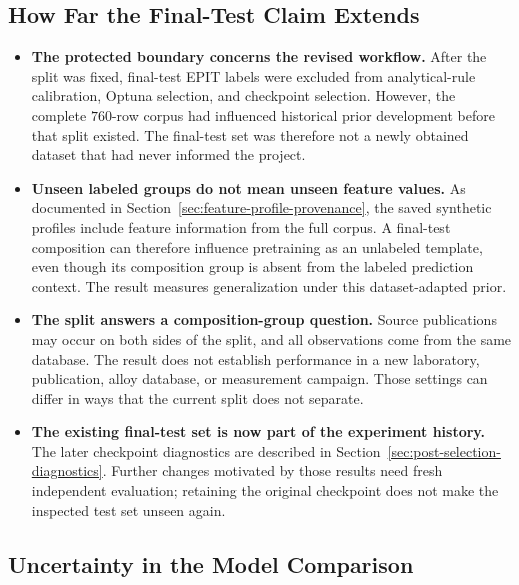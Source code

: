 \documentclass[11pt]{article}
\newenvironment{notes}
  {\begin{itemize}\setlength{\itemsep}{0.45em}\setlength{\parsep}{0pt}}
  {\end{itemize}}
\begin{document}
\subsection{How Far the Final-Test Claim Extends}
\label{sec:generalization-boundary}

\begin{notes}
    \item \textbf{The protected boundary concerns the revised workflow.}
    After the split was fixed, final-test EPIT labels were
    excluded from analytical-rule calibration, Optuna
    selection, and checkpoint selection.
    However, the complete \(760\)-row corpus had influenced
    historical prior development before that split existed.
    The final-test set was therefore not a newly obtained
    dataset that had never informed the project.

    \item \textbf{Unseen labeled groups do not mean unseen feature values.}
    As documented in
    Section~\ref{sec:feature-profile-provenance}, the saved
    synthetic profiles include feature information from
    the full corpus. A final-test composition can therefore
    influence pretraining as an unlabeled template, even
    though its composition group is absent from the labeled
    prediction context.
    The result measures generalization under this
    dataset-adapted prior.

    \item \textbf{The split answers a composition-group question.}
    Source publications may occur on both sides of the
    split, and all observations come from the same database.
    The result does not establish performance in a new
    laboratory, publication, alloy database, or measurement
    campaign. Those settings can differ in ways that the
    current split does not separate.

    \item \textbf{The existing final-test set is now part of the experiment history.}
    The later checkpoint diagnostics are described in
    Section~\ref{sec:post-selection-diagnostics}.
    Further changes motivated by those results need fresh
    independent evaluation; retaining the original checkpoint
    does not make the inspected test set unseen again.
\end{notes}

\subsection{Uncertainty in the Model Comparison}
\label{sec:statistical-limitations}
\end{document}
